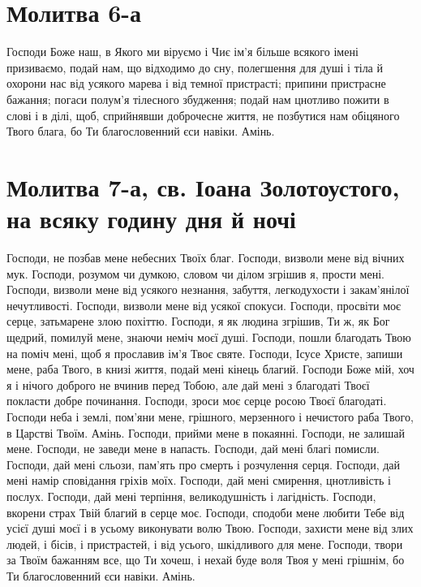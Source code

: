 \documentclass[chapters.tex]{subfiles}
\begin{document}
\section{Молитва 6-а}
Господи Боже наш, в Якого ми віруємо і Чиє ім’я більше всякого імені призиваємо, подай нам, що відходимо до сну, полегшення для душі і тіла й охорони нас від усякого марева і від темної пристрасті; припини пристрасне бажання; погаси полум’я тілесного збудження; подай нам цнотливо пожити в слові і в ділі, щоб, сприйнявши доброчесне життя, не позбутися нам обіцяного Твого блага, бо Ти благословенний єси навіки. Амінь.

\section{Молитва 7-а, св. Іоана Золотоустого, на всяку годину дня й ночі}
Господи, не позбав мене небесних Твоїх благ. Господи, визволи мене від вічних мук. Господи, розумом чи думкою, словом чи ділом згрішив я, прости мені. Господи, визволи мене від усякого незнання, забуття, легкодухости і закам’янілої нечутливості. Господи, визволи мене від усякої спокуси. Господи, просвіти моє серце, затьмарене злою похіттю. Господи, я як людина згрішив, Ти ж, як Бог щедрий, помилуй мене, знаючи неміч моєї душі. Господи, пошли благодать Твою на поміч мені, щоб я прославив ім’я Твоє святе. Господи, Ісусе Христе, запиши мене, раба Твого, в книзі життя, подай мені кінець благий. Господи Боже мій, хоч я і нічого доброго не вчинив перед Тобою, але дай мені з благодаті Твоєї покласти добре починання. Господи, зроси моє серце росою Твоєї благодаті. Господи неба і землі, пом’яни мене, грішного, мерзенного і нечистого раба Твого, в Царстві Твоїм. Амінь. Господи, прийми мене в покаянні. Господи, не залишай мене. Господи, не заведи мене в напасть. Господи, дай мені благі помисли. Господи, дай мені сльози, пам’ять про смерть і розчулення серця. Господи, дай мені намір сповідання гріхів моїх. Господи, дай мені смирення, цнотливість і послух. Господи, дай мені терпіння, великодушність і лагідність. Господи, вкорени страх Твій благий в серце моє. Господи, сподоби мене любити Тебе від усієї душі моєї і в усьому виконувати волю Твою. Господи, захисти мене від злих людей, і бісів, і пристрастей, і від усього, шкідливого для мене. Господи, твори за Твоїм бажанням все, що Ти хочеш, і нехай буде воля Твоя у мені грішнім, бо Ти благословенний єси навіки. Амінь.
\end{document}
